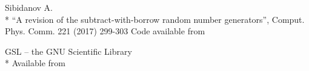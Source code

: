 \documentclass[letterpaper,12pt]{article}
\begin{document}
\begin{thebibliography}{99}




  Sibidanov A.\\*
  ``A revision of the subtract-with-borrow random number generators'',
  Comput. Phys. Comm. 221 (2017) 299-303
  Code available from 

\begin{samepage}
  GSL -- the GNU Scientific Library\\*
  Available from 
\end{samepage}



\end{thebibliography}
\end{document}

